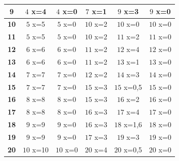 \documentclass{article}
\begin{document}
\begin{center}
\begin{tabular}{|c||c|c|c|c|c|}
        \hline
        \textbf{9}& \cellcolor[HTML]{3FFC45}$4$ x={4} & \cellcolor[HTML]{FC3F3F}$4$ x={0}& \cellcolor[HTML]{3FFC45}$7$ x={1} & \cellcolor[HTML]{3FFC45}$9$ x={3} & \cellcolor[HTML]{FC3F3F}$9$ x={0}\\
        \hline
        \textbf{10}& \cellcolor[HTML]{3FFC45}$5$ x={5} & \cellcolor[HTML]{FC3F3F}$5$ x={0}& \cellcolor[HTML]{3FFC45}$10$ x={2} & \cellcolor[HTML]{FC3F3F}$10$ x={0}& \cellcolor[HTML]{FC3F3F}$10$ x={0}\\
        \hline
        \textbf{11}& \cellcolor[HTML]{3FFC45}$5$ x={5} & \cellcolor[HTML]{FC3F3F}$5$ x={0}& \cellcolor[HTML]{3FFC45}$10$ x={2} & \cellcolor[HTML]{3FFC45}$11$ x={2} & \cellcolor[HTML]{FC3F3F}$11$ x={0}\\
        \hline
        \textbf{12}& \cellcolor[HTML]{3FFC45}$6$ x={6} & \cellcolor[HTML]{FC3F3F}$6$ x={0}& \cellcolor[HTML]{3FFC45}$11$ x={2} & \cellcolor[HTML]{3FFC45}$12$ x={4} & \cellcolor[HTML]{FC3F3F}$12$ x={0}\\
        \hline
        \textbf{13}& \cellcolor[HTML]{3FFC45}$6$ x={6} & \cellcolor[HTML]{FC3F3F}$6$ x={0}& \cellcolor[HTML]{3FFC45}$11$ x={2} & \cellcolor[HTML]{3FFC45}$13$ x={1} & \cellcolor[HTML]{FC3F3F}$13$ x={0}\\
        \hline
        \textbf{14}& \cellcolor[HTML]{3FFC45}$7$ x={7} & \cellcolor[HTML]{FC3F3F}$7$ x={0}& \cellcolor[HTML]{3FFC45}$12$ x={2} & \cellcolor[HTML]{3FFC45}$14$ x={3} & \cellcolor[HTML]{FC3F3F}$14$ x={0}\\
        \hline
        \textbf{15}& \cellcolor[HTML]{3FFC45}$7$ x={7} & \cellcolor[HTML]{FC3F3F}$7$ x={0}& \cellcolor[HTML]{3FFC45}$15$ x={3} & \cellcolor[HTML]{3F62FC}$15$ x={0,5}& \cellcolor[HTML]{FC3F3F}$15$ x={0}\\
        \hline
        \textbf{16}& \cellcolor[HTML]{3FFC45}$8$ x={8} & \cellcolor[HTML]{FC3F3F}$8$ x={0}& \cellcolor[HTML]{3FFC45}$15$ x={3} & \cellcolor[HTML]{3FFC45}$16$ x={2} & \cellcolor[HTML]{FC3F3F}$16$ x={0}\\
        \hline
        \textbf{17}& \cellcolor[HTML]{3FFC45}$8$ x={8} & \cellcolor[HTML]{FC3F3F}$8$ x={0}& \cellcolor[HTML]{3FFC45}$16$ x={3} & \cellcolor[HTML]{3FFC45}$17$ x={4} & \cellcolor[HTML]{FC3F3F}$17$ x={0}\\
        \hline
        \textbf{18}& \cellcolor[HTML]{3FFC45}$9$ x={9} & \cellcolor[HTML]{FC3F3F}$9$ x={0}& \cellcolor[HTML]{3FFC45}$16$ x={3} & \cellcolor[HTML]{3F62FC}$18$ x={1,6}& \cellcolor[HTML]{FC3F3F}$18$ x={0}\\
        \hline
        \textbf{19}& \cellcolor[HTML]{3FFC45}$9$ x={9} & \cellcolor[HTML]{FC3F3F}$9$ x={0}& \cellcolor[HTML]{3FFC45}$17$ x={3} & \cellcolor[HTML]{3FFC45}$19$ x={3} & \cellcolor[HTML]{FC3F3F}$19$ x={0}\\
        \hline
        \textbf{20}& \cellcolor[HTML]{3FFC45}$10$ x={10} & \cellcolor[HTML]{FC3F3F}$10$ x={0}& \cellcolor[HTML]{3FFC45}$20$ x={4} & \cellcolor[HTML]{3F62FC}$20$ x={0,5}& \cellcolor[HTML]{FC3F3F}$20$ x={0}\\
        \hline
    \end{tabular}
\end{center}
\end{document}
